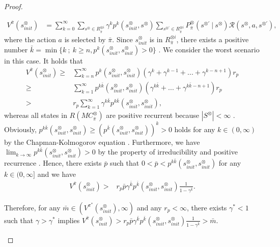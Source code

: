 \documentclass[a4j,12pt,oneside,openany,english]{jsbook}
\begin{document}
\begin{proof}
\begin{enumerate}
    \begin{align}
      V^{\bar{\pi}}(s^{\otimes}_{init})
       &= \sum_{k=0}^{\infty} \sum_{s^{\otimes} \in R^{\otimes i}_{\bar{\pi}}} \gamma^k p^k(s^{\otimes}_{init}, s^{\otimes}) \sum_{s^{\otimes \prime} \in R^{\otimes i}_{\bar{\pi}}}  P^{\otimes}_{\bar{\pi}}(s^{\otimes \prime}\ |\ s^{\otimes}) \mathcal{R}(s^{\otimes}, a, s^{\otimes \prime}), \nonumber
    \end{align}
    where the action $a$ is selected by $\bar{\pi}$. Since $s^{\otimes}_{init}$ is in $R^{\otimes i}_{\bar{\pi}}$, there exists a positive number $\bar{k} = \min \{ k\ ;\ k \geq n, p^{k}(s^{\otimes}_{init}, s^{\otimes}_{init}) > 0 \}$ \cite{ESS}. We consider the worst scenario in this case. It holds that
    \begin{align}
      V^{\bar{\pi}}(s^{\otimes}_{init})
       \geq & \sum_{k=n}^{\infty} p^{k}(s^{\otimes}_{init}, s^{\otimes}_{init})(\gamma^k + \gamma^{k - 1} +...+ \gamma^{k - n + 1})r_p \nonumber \\
       \geq & \sum_{k=1}^{\infty} p^{k \bar{k}}(s^{\otimes}_{init}, s^{\otimes}_{init}) (\gamma^{k \bar{k}} +...+ \gamma^{k \bar{k} - n + 1})r_p \nonumber \\
       > & r_p \sum_{k=1}^{\infty} \gamma^{k \bar{k}} p^{k \bar{k}}(s^{\otimes}_{init}, s^{\otimes}_{init}), \nonumber
    \end{align}
whereas all states in $R(MC^{\otimes}_{\bar{\pi}})$ are positive recurrent because $|S^{\otimes}| < \infty$ \cite{ISP}. Obviously, $p^{k \bar{k}}(s^{\otimes}_{init}, s^{\otimes}_{init}) \geq (p^{\bar{k}}(s^{\otimes}_{init}, s^{\otimes}_{init}))^k > 0$ holds for any $k \in (0, \infty)$ by the Chapman-Kolmogorov equation \cite{ESS}. Furthermore, we have $\lim_{k \rightarrow \infty} p^{k \bar{k}}(s^{\otimes}_{init}, s^{\otimes}_{init}) > 0$ by the property of irreducibility and positive recurrence \cite{SM}. Hence, there exists $\bar{p}$ such that $0<\bar{p}<p^{k \bar{k}}(s^{\otimes}_{init}, s^{\otimes}_{init})$ for any $k \in (0, \infty]$ and we have
    \begin{align}
       V^{\bar{\pi}}(s^{\otimes}_{init}) > & r_p \bar{p} \gamma^{\bar{k}} p^{\bar{k}}(s^{\otimes}_{init},s^{\otimes}_{init}) \frac{1}{ 1 - \gamma^{\bar{k}} }. \nonumber
    \end{align}

    Therefore, for any $\bar{m} \in (V^{\pi^{\ast}}(s^{\otimes}_{init}), \infty)$ and any $r_p < \infty$, there exists $\gamma^{\ast}<1$ such that $\gamma > \gamma^{\ast}$ implies $V^{\bar{\pi}}(s^{\otimes}_{init}) > r_p \bar{p} \gamma^{\bar{k}} p^{\bar{k}}(s^{\otimes}_{init},s^{\otimes}_{init}) \frac{1}{ 1 - \gamma^{\bar{k}} } > \bar{m}.$


\end{enumerate}
\end{proof}
\end{document}

